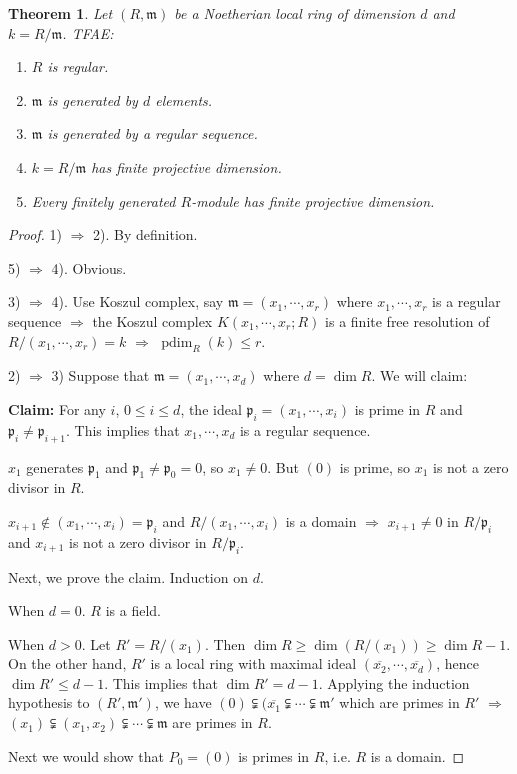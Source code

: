 \documentclass[cs4size]{article}
\newcommand{\frm}{\mathfrak{m}}
\newcommand{\frp}{\mathfrak{p}}
\newcommand{\Ra}{\Rightarrow}
\DeclareMathOperator{\pdim}{pdim}
\newtheorem{thm}{Theorem}
\begin{document}
\begin{thm}
Let $(R,\frm)$ be a Noetherian local ring of dimension $d$ and $k=R/\frm$. TFAE:
\begin{enumerate}
\item $R$ is regular.
\item $\frm$ is generated by $d$ elements.
\item $\frm$ is generated by a regular sequence.
\item $k=R/\frm$ has finite projective dimension.
\item Every finitely generated $R$-module has finite projective dimension.
\end{enumerate}
\end{thm}
\begin{proof}
1) $\Ra$ 2). By definition.

5) $\Ra$ 4). Obvious.

3) $\Ra$ 4). Use Koszul complex, say $\frm=(x_1,\cdots,x_r)$ where $x_1,\cdots,x_r$ is a regular sequence $\Ra$ the Koszul complex $K(x_1,\cdots,x_r;R)$ is a finite free resolution of $R/(x_1,\cdots,x_r)=k$ $\Ra$ $\pdim_R(k)\leq r$.

2) $\Ra$ 3) Suppose that $\frm=(x_1,\cdots,x_d)$ where $d=\dim R$. We will claim:

\textbf{Claim:} For any $i$, $0\leq i\leq d$, the ideal $\frp_i=(x_1,\cdots,x_i)$ is prime in $R$ and $\frp_i\neq \frp_{i+1}$. This implies that $x_1,\cdots,x_d$ is a regular sequence.

$x_1$ generates $\frp_1$ and $\frp_1\neq\frp_0=0$, so $x_1\neq 0$. But $(0)$ is prime, so $x_1$ is not a zero divisor in $R$.

$x_{i+1}\notin (x_1,\cdots,x_i)=\frp_i$ and $R/(x_1,\cdots,x_i)$ is a domain $\Ra$ $x_{i+1}\neq 0$ in $R/\frp_i$ and $x_{i+1}$ is not a zero divisor in $R/\frp_i$.

Next, we prove the claim. Induction on $d$.

When $d=0$. $R$ is a field.

When $d>0$. Let $R'=R/(x_1)$. Then $\dim R\geq \dim (R/(x_1))\geq \dim R-1$. On the other hand, $R'$ is a local ring with maximal ideal $(\overline{x_2},\cdots,\overline{x_d})$, hence $\dim R'\leq d-1$. This implies that $\dim R'=d-1$. Applying the induction hypothesis to $(R',\frm')$, we have $(0)\subsetneqq (\overline{x_1}\subsetneqq\cdots\subsetneqq\frm'$ which are primes in $R'$ $\Ra$ $(x_1)\subsetneqq(x_1,x_2)\subsetneqq\cdots\subsetneqq\frm$ are primes in $R$.

Next we would show that $P_0=(0)$ is primes in $R$, i.e. $R$ is a domain.


\end{proof}
\end{document}
